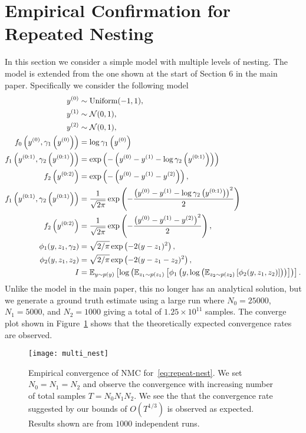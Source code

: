 
\section{Empirical Confirmation for Repeated Nesting}
\label{sec:exp-repeat-app}

In this section we consider a simple model with multiple levels of nesting.  The model is extended from
the one shown at the start of Section 6 in the main paper.  Specifically we consider the following model
\begin{align}
	\begin{split}
\label{eq:repeat-nest}
y^{(0)} &\sim \mathrm{Uniform}(-1,1), \\
y^{(1)} &\sim \mathcal{N}(0,1), \\
y^{(2)} &\sim \mathcal{N}(0,1), \\
f_0 \left(y^{(0)}, \gamma_1\left(y^{(0)}\right)\right)&= \log \gamma_1\left(y^{(0)}\right)\\
f_1 \left(y^{(0:1)}, \gamma_2\left(y^{(0:1)}\right)\right)&= 
\exp\left(-\left(y^{(0)}-y^{(1)}-\log \gamma_2\left(y^{(0:1)}\right)\right)\right)\\
f_2 \left(y^{(0:2)}\right)&=\exp\left(-\left(y^{(0)}-y^{(1)}-y^{(2)}\right)\right),\\
f_1 \left(y^{(0:1)}, \gamma_2\left(y^{(0:1)}\right)\right)&= 
	\frac{1}{\sqrt{2\pi}}\exp\left(-\frac{\left(y^{(0)}-y^{(1)}-\log \gamma_2\left(y^{(0:1)}\right)\right)^2}{2} \right)\\
f_2 \left(y^{(0:2)}\right)&=\frac{1}{\sqrt{2\pi}}\exp\left(-\frac{\left(y^{(0)}-y^{(1)}-y^{(2)}\right)^2}{2}\right),\\
\phi_1(y,z_1,\gamma_2) &= \sqrt{2/\pi}\exp\left(-2(y-z_1)^2\right), \\
\phi_2(y,z_1,z_2) &= \sqrt{2/\pi}\exp\left(-2(y-z_1-z_2)^2\right), \\
I &= \mathbb{E}_{y\sim p(y)}\left[\log\left(\mathbb{E}_{z_1\sim p(z_1)}\left[\phi_1\left(y,\log\left(\mathbb{E}_{z_2\sim
	 p(z_2)}\left[\phi_2(y,z_1,z_2)\right]\right)\right)\right]\right)\right].
\end{split}
\end{align}
Unlike the model in the main paper, this no longer has an analytical solution, but we generate a
ground truth estimate using a large run where $N_0 = 25000$, $N_1=5000$, and $N_2=1000$ giving 
a total of $1.25 \times 10^{11}$ samples.  The converge plot shown in Figure~\ref{fig:multi-nest} shows that the
theoretically expected convergence rates are observed.


\begin{figure}[t]
	\centering
	\texttt{[image: multi\_nest]}
	\caption{Empirical convergence of NMC for~\eqref{eq:repeat-nest}.  We set $N_0=N_1 = N_2$ and
		observe the convergence with increasing number of total samples $T=N_0 N_1 N_2$.  We
		see the that the convergence rate suggested by our bounds of $O(T^{1/3})$ is observed as
		expected.  Results shown are from $1000$ independent runs.
		\label{fig:multi-nest}}
\end{figure}	
